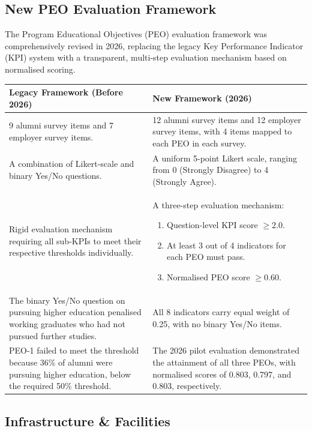 \subsection{New PEO Evaluation Framework}
\label{subsec:new-peo-evaluation-framework}

The Program Educational Objectives (PEO) evaluation framework
was comprehensively revised in 2026, replacing the legacy
Key Performance Indicator (KPI) system with a transparent,
multi-step evaluation mechanism based on normalised scoring.

\begin{longtable}{|p{6.2cm}|p{8.8cm}|}
\hline
\textbf{Legacy Framework (Before 2026)} &
\textbf{New Framework (2026)} \\
\hline
9 alumni survey items and 7 employer survey items.
&
12 alumni survey items and 12 employer survey items,
with 4 items mapped to each PEO in each survey. \\
\hline

A combination of Likert-scale and binary Yes/No questions.
&
A uniform 5-point Likert scale, ranging from
0 (Strongly Disagree) to 4 (Strongly Agree). \\
\hline

Rigid evaluation mechanism requiring all sub-KPIs to meet
their respective thresholds individually.
&
A three-step evaluation mechanism:
\begin{enumerate}
    \item Question-level KPI score $\geq 2.0$.
    \item At least 3 out of 4 indicators for each PEO must pass.
    \item Normalised PEO score $\geq 0.60$.
\end{enumerate}
\\
\hline

The binary Yes/No question on pursuing higher education
penalised working graduates who had not pursued further studies.
&
All 8 indicators carry equal weight of 0.25, with no
binary Yes/No items.
\\
\hline

PEO-1 failed to meet the threshold because 36\% of alumni
were pursuing higher education, below the required 50\%
threshold.
&
The 2026 pilot evaluation demonstrated the attainment
of all three PEOs, with normalised scores of 0.803,
0.797, and 0.803, respectively.
\\
\hline
\end{longtable}


\subsection{Infrastructure \& Facilities}
\label{subsec:infrastructure-facilities}

